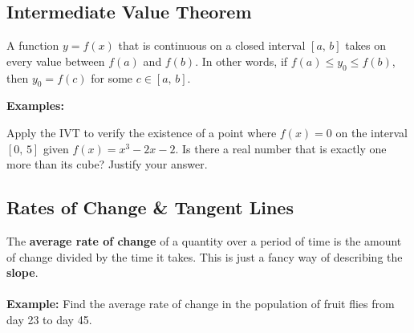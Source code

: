 \documentclass[addpoints, 12pt]{exam}
\begin{document}
\subsection*{Intermediate Value Theorem}
\begin{tcolorbox}[title= THE INTERMEDIATE VALUE THEOREM,black,sharp corners,colback=white,colbacktitle=white,coltitle=black,boxrule=1pt]

    A function $y=f(x)$ that is continuous on a closed interval $[a,\,b]$ takes on every value between $f(a)$ and $f(b)$. In other words, if $f(a)\le y_0\le f(b)$, then $y_0=f(c)$ for some $c\in[a,\,b]$.
\end{tcolorbox}
\vspace{.15cm}
\noindent\textbf{Examples:}
\begin{questions}
    \question Apply the IVT to verify the existence of a point where $f(x)=0$ on the interval $[0,\,5]$ given $f(x)=x^3-2x-2$.
    \question Is there a real number that is exactly one more than its cube? Justify your answer.
\end{questions}



\newpage
{}
\subsection*{Rates of Change \& Tangent Lines}

The \textbf{average rate of change} of a quantity over a period of time is the amount of change divided by the time it takes. This is just a fancy way of describing the \textbf{slope}.\\
\\
\noindent\textbf{Example:} Find the average rate of change in the population of fruit flies from day 23 to day 45.
\end{document}
